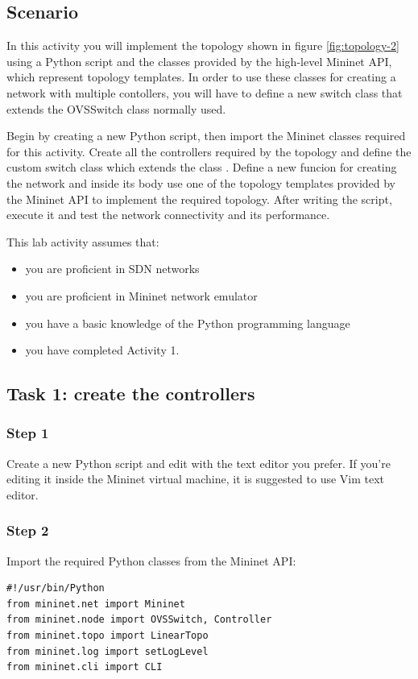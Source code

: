 \subsection*{Scenario}
In this activity you will implement the topology shown in figure \ref{fig:topology-2} using
a Python script and the classes provided by the high-level Mininet API, which
represent topology templates. In order to use these classes for creating a network
with multiple contollers, you will have to define a new switch class that extends
the OVSSwitch class normally used.

Begin by creating a new Python script, then import the Mininet classes required for
this activity. Create all the controllers required by the topology and define
the custom switch class which extends the class . Define a new funcion for creating
the network and inside its body use one of the topology templates provided
by the Mininet API to implement the required topology.
After writing the script, execute it and test the network connectivity and its
performance.

This lab activity assumes that:
\begin{itemize}
  \item you are proficient in SDN networks
  \item you are proficient in Mininet network emulator
  \item you have a basic knowledge of the Python programming language
  \item you have completed Activity 1.
\end{itemize}






\subsection*{Task 1: create the controllers}
\subsubsection*{Step 1}
Create a new Python script and edit with the text editor you prefer. If you're editing
it inside the Mininet virtual machine, it is suggested to use Vim text editor.

\subsubsection*{Step 2}
Import the required Python classes from the Mininet API:
\begin{lstlisting}
#!/usr/bin/Python
from mininet.net import Mininet
from mininet.node import OVSSwitch, Controller
from mininet.topo import LinearTopo
from mininet.log import setLogLevel
from mininet.cli import CLI
\end{lstlisting}

